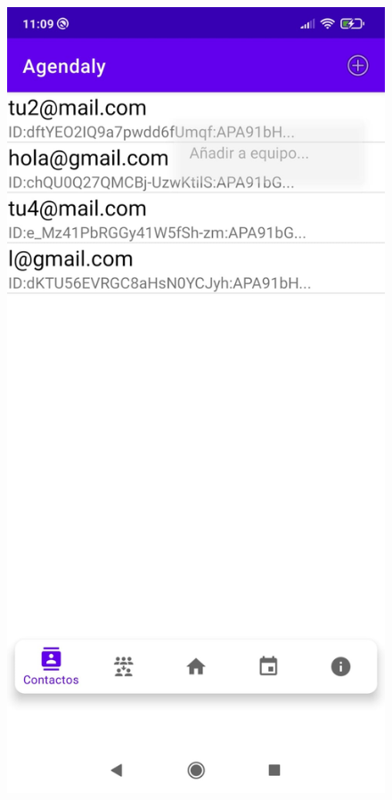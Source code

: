\documentclass[a4paper,openright,12pt]{article}
\begin{document}
\begin{figure}
    \centering
    \includegraphics[scale=0.05]{contacts_view.jpeg} \hfill

\end{figure}
\end{document}
